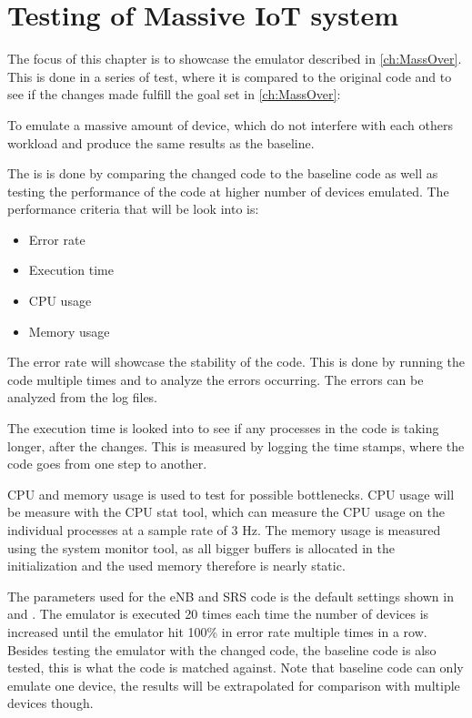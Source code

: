 \chapter{Testing of Massive IoT system} \label{ch:mass_test}
The focus of this chapter is to showcase the emulator described in \autoref{ch:MassOver}. This is done in a series of test, where it is compared to the original code and to see if the changes made fulfill the goal set in \autoref{ch:MassOver}:

To emulate a massive amount of device, which do not interfere with each others workload and produce the same results as the baseline.

The is is done by comparing the changed code to the baseline code as well as testing the performance of the code at higher number of devices emulated.
The performance criteria that will be look into is:

\begin{itemize}
\item Error rate
\item Execution time
\item CPU usage
\item Memory usage
\end{itemize}

The error rate will showcase the stability of the code. This is done by running the code multiple times and to analyze the errors occurring. The errors can be analyzed from the log files.

The execution time is looked into to see if any processes in the code is taking longer, after the changes. This is measured by logging the time stamps, where the code goes from one step to another. 

CPU and memory usage is used to test for possible bottlenecks. CPU usage will be measure with the CPU stat tool, which can measure the CPU usage on the individual processes at a sample rate of 3 Hz. The memory usage is measured using the system monitor tool, as all bigger buffers is allocated in the initialization and the used memory therefore is nearly static. 

The parameters used for the eNB and SRS code is the default settings shown in  and . The emulator is executed 20 times each time the number of devices is increased until the emulator hit 100\% in error rate multiple times in a row. Besides testing the emulator with the changed code, the baseline code is also tested, this is what the code is matched against. Note that baseline code can only emulate one device, the results will be extrapolated for comparison with multiple devices though.

